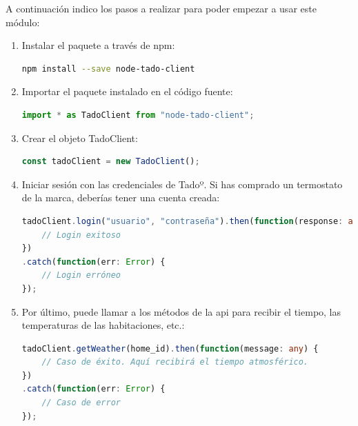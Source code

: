 \documentclass[spanish,12pt, a4paper, twoside]{paper}
\begin{document}
A continuación indico los pasos a realizar para poder empezar a usar este módulo:
\begin{enumerate}
\item Instalar el paquete a través de npm:
\begin{lstlisting}[language=sh]
npm install --save node-tado-client
\end{lstlisting}
\item Importar el paquete instalado en el código fuente:
\begin{lstlisting}[language=TypeScript]
import * as TadoClient from "node-tado-client";
\end{lstlisting}
\item Crear el objeto TadoClient:
\begin{lstlisting}[language=TypeScript]
const tadoClient = new TadoClient();
\end{lstlisting}
\item Iniciar sesión con las credenciales de Tadoº. Si has comprado un termostato de la marca, deberías tener una cuenta creada:
\begin{lstlisting}[language=TypeScript]
tadoClient.login("usuario", "contraseña").then(function(response: any) {
	// Login exitoso
})
.catch(function(err: Error) {
	// Login erróneo
});
\end{lstlisting}
\item Por último, puede llamar a los métodos de la api para recibir el tiempo, las temperaturas de las habitaciones, etc.:
\begin{lstlisting}[language=TypeScript]
tadoClient.getWeather(home_id).then(function(message: any) {
	// Caso de éxito. Aquí recibirá el tiempo atmosférico.
})
.catch(function(err: Error) {
	// Caso de error
});
\end{lstlisting}
\end{enumerate}
\end{document}
